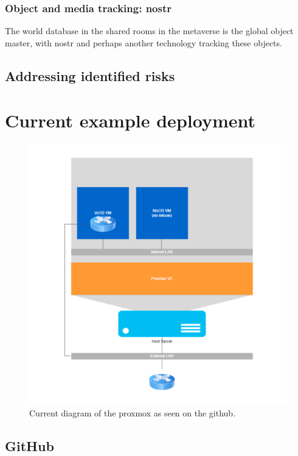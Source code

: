 \subsection{Object and media tracking: nostr}
The world database in the shared rooms in the metaverse is the global object master, with nostr and perhaps another technology tracking these objects.\par
\section{Addressing identified risks}
\chapter{Current example deployment }
\begin{figure}[ht]\centering %
	\includegraphics{proxmoxmap}
	\caption{Current diagram of the proxmox as seen on the github.}
	\label{fig:proxmoxmap}
\end{figure}
\section{GitHub }
